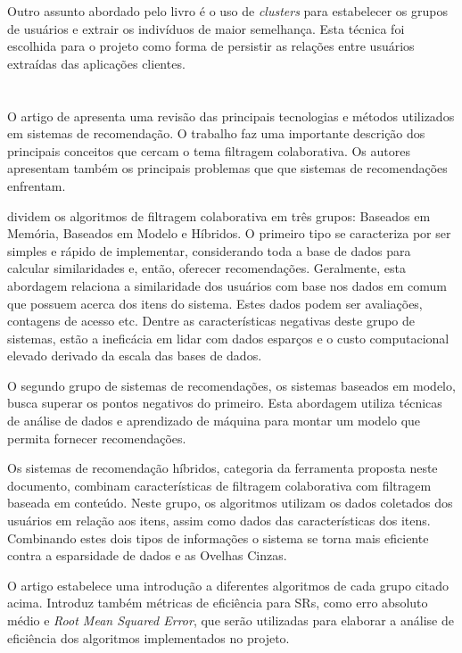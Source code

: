 \documentclass[
	12pt,				%
    oneside,			%
	a4paper,			%
	english,			%
	french,				%
	spanish,			%
	brazil,				%
	]{abntex2}
\begin{document}
Outro assunto abordado pelo livro é o uso de \textit{clusters} para estabelecer os grupos de usuários e extrair os indivíduos de maior semelhança. Esta técnica 
foi escolhida para o projeto como forma de persistir as relações entre usuários extraídas das aplicações clientes.

\section{}
O artigo de  apresenta uma revisão das principais tecnologias e métodos utilizados em sistemas de recomendação. O trabalho faz uma 
importante descrição dos principais conceitos que cercam o tema filtragem colaborativa. Os autores apresentam também os principais problemas que 
que sistemas de recomendações enfrentam.

 dividem os algoritmos de filtragem colaborativa em três grupos: Baseados em Memória, Baseados em Modelo e Híbridos. O primeiro 
tipo se caracteriza por ser simples e rápido de implementar, considerando toda a base de dados para calcular similaridades e, então, oferecer recomendações.
Geralmente, esta abordagem relaciona a similaridade dos usuários com base nos dados em comum que possuem acerca dos itens do sistema. Estes dados podem ser
avaliações, contagens de acesso etc. Dentre as características negativas deste grupo de sistemas, estão a ineficácia em lidar com dados esparços e o custo computacional
elevado derivado da escala das bases de dados. 

O segundo grupo de sistemas de recomendações, os sistemas baseados em modelo, busca superar os pontos negativos do primeiro. Esta abordagem utiliza técnicas de
análise de dados e aprendizado de máquina para montar um modelo que permita fornecer recomendações. 

Os sistemas de recomendação híbridos, categoria da ferramenta proposta neste documento, combinam características de filtragem colaborativa com filtragem baseada
em conteúdo. Neste grupo, os algoritmos utilizam os dados coletados dos usuários em relação aos itens, assim como dados das características dos itens.
Combinando estes dois tipos de informações o sistema se torna mais eficiente contra a esparsidade de dados e as Ovelhas Cinzas.

O artigo estabelece uma introdução a diferentes algoritmos de cada grupo citado acima. Introduz também métricas de eficiência para SRs,	 como
erro absoluto médio e \textit{Root Mean Squared Error}, que serão utilizadas para elaborar a análise de eficiência dos algoritmos implementados no projeto.
\end{document}
